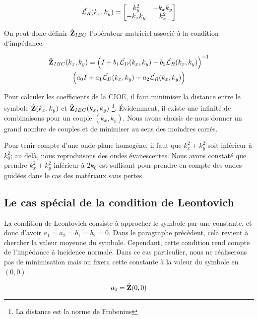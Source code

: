     \begin{equation}
      \hat{{\mathcal{L}_R}}(k_x,k_y) =
      \begin{bmatrix}
        k_y^2 & -k_x k_y
        \\
        -k_x k_y & k_x^2
      \end{bmatrix}
    \end{equation}

    On peut donc définir \(\hat{\mathbf{Z}}_{IBC}\) l’opérateur matriciel associé à la condition d'impédance.

    \begin{multline}
        \hat{\mathbf{Z}}_{IBC}(k_x,k_y) = \left(I + b_1 \hat{{\mathcal{L}_D}}(k_x,k_y) - b_2 \hat{{\mathcal{L}_R}}(k_x,k_y) \right)^{-1}
        \\
        \left(a_0 I + a_1 \hat{{\mathcal{L}_D}}(k_x,k_y) - a_2 \hat{{\mathcal{L}_R}}(k_x,k_y)\right)
    \end{multline}

    Pour calculer les coefficients de la CIOE, il faut minimiser la distance entre le symbole \(\hat{\mathbf{Z}}(k_x,k_y)\) et \(\hat{\mathbf{Z}}_{IBC}(k_x,k_y)\) \footnote{La distance est la norme de Frobenius}. Évidemment, il existe une infinité de combinaisons pour un couple \((k_x,k_y)\). Nous avons choisis de nous donner un grand nombre de couples et de minimiser au sens des moindres carrés.

    Pour tenir compte d'une onde plane homogène, il faut que \(k_x^2 + k_y^2\) soit inférieur à \(k_0^2\); au delà, nous reproduisons des ondes évanescentes. Nous avons constaté que prendre \(k_x^2 + k_y^2\) inférieur à \(2k_0\) est suffisant pour prendre en compte des ondes guidées dans le cas des matériaux sans pertes.

  \subsection{Le cas spécial de la condition de Leontovich}

    La condition de Leontovich consiste à approcher le symbole par une constante, et donc d'avoir \(a_1=a_2=b_1=b_2=0\). Dans le paragraphe précèdent, cela revient à chercher la valeur moyenne du symbole. Cependant, cette condition rend compte de l'impédance à incidence normale. Dans ce cas particulier, nous ne réaliserons pas de minimisation mais on fixera cette constante à la valeur du symbole en \((0,0)\).

    \begin{equation}
      a_0 = \hat{\mathbf{Z}}(0,0)
    \end{equation}

